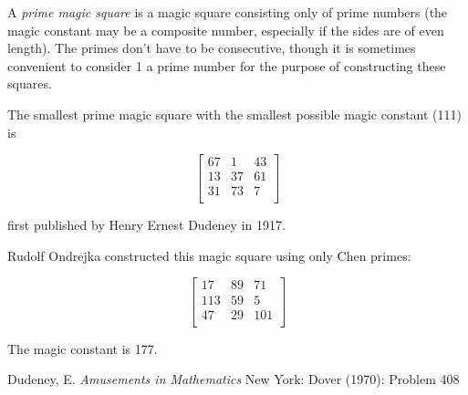 \documentclass[12pt]{article}
\begin{document}
A {\em prime magic square} is a magic square consisting only of prime numbers (the magic constant may be a composite number, especially if the sides are of even length). The primes don't have to be consecutive, though it is sometimes convenient to consider 1 a prime number for the purpose of constructing these squares.

The smallest prime magic square with the smallest possible magic constant (111) is 

$$\begin{bmatrix}
67 & 1 & 43 \\
13 & 37 & 61 \\
31 & 73 & 7 \\
\end{bmatrix}$$

first published by Henry Ernest Dudeney in 1917.

Rudolf Ondrejka constructed this magic square using only Chen primes:

$$\begin{bmatrix}
17 & 89 & 71 \\
113 & 59 & 5 \\
47 & 29 & 101 \\
\end{bmatrix}$$

The magic constant is 177.

\begin{thebibliography}{1}
 Dudeney, E. {\it Amusements in Mathematics} New York: Dover (1970): Problem 408
\end{thebibliography}
\end{document}
